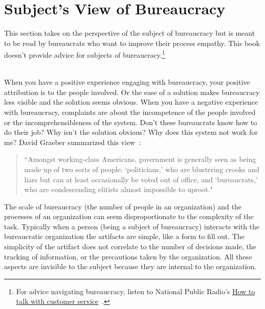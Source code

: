 \section{Subject's View of Bureaucracy\label{sec:subjects-view}}

This section takes on the perspective of the subject of bureaucracy but is meant to be read by bureaucrats who want to improve their \gls{process empathy}. This book doesn't provide advice for subjects of bureaucracy.\footnote{For advice navigating bureaucracy, listen to National Public Radio's \href{https://www.npr.org/2022/03/16/1086915600/get-what-you-want-customer-service}{How to talk with customer service}~\cite{2022_LifeKit}.} 

\ \\

When you have a positive experience engaging with bureaucracy, your positive attribution is to the people involved. Or the ease of a solution makes bureaucracy less visible and the solution seems obvious. 
When you have a negative experience with bureaucracy, complaints are about the incompetence of the people involved or the incomprehensibleness of the system. Don't these bureaucrats know how to do their job? Why isn't the solution obvious? Why does this system not work for me? David Graeber summarized this view~\cite{2015_Graeber_regulation}:
\begin{quote}
 ``Amongst working-class Americans, government is generally seen as being made up of two sorts of people: `politicians,' who are blustering crooks and liars but can at least occasionally be voted out of office, and `bureaucrats,' who are condescending elitists almost impossible to uproot."
\end{quote}



The scale of bureaucracy (the number of people in an organization) and the processes of an organization can seem disproportionate to the complexity of the task. Typically when a person (being a subject of bureaucracy) interacts with the bureaucratic organization the artifacts are simple, like a form to fill out. The simplicity of the artifact does not correlate to the number of decisions made, the tracking of information, or the precautions taken by the organization. All these aspects are invisible to the subject because they are internal to the organization.

